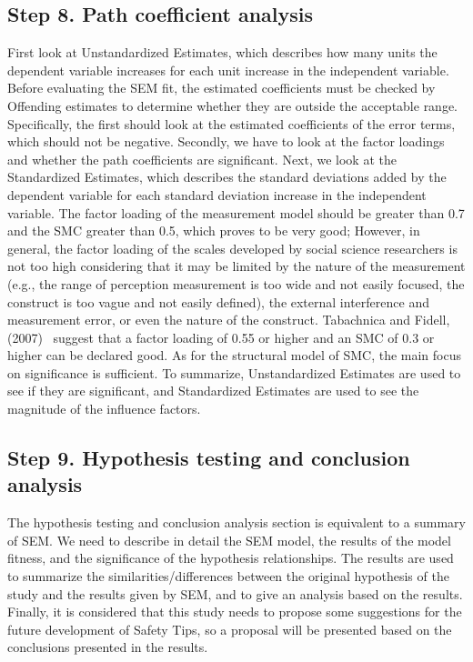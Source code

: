 \subsection{Step 8. Path coefficient analysis}
\label{step8}
First look at Unstandardized Estimates, which describes how many units the dependent variable increases for each unit increase in the independent variable. Before evaluating the SEM fit, the estimated coefficients must be checked by Offending estimates to determine whether they are outside the acceptable range. Specifically, the first should look at the estimated coefficients of the error terms, which should not be negative. Secondly, we have to look at the factor loadings and whether the path coefficients are significant. Next, we look at the Standardized Estimates, which describes the standard deviations added by the dependent variable for each standard deviation increase in the independent variable. The factor loading of the measurement model should be greater than 0.7 and the SMC greater than 0.5, which proves to be very good; However, in general, the factor loading of the scales developed by social science researchers is not too high considering that it may be limited by the nature of the measurement (e.g., the range of perception measurement is too wide and not easily focused, the construct is too vague and not easily defined), the external interference and measurement error, or even the nature of the construct. Tabachnica and Fidell, (2007)~\cite{ref26} suggest that a factor loading of 0.55 or higher and an SMC of 0.3 or higher can be declared good. As for the structural model of SMC, the main focus on significance is sufficient. To summarize, Unstandardized Estimates are used to see if they are significant, and Standardized Estimates are used to see the magnitude of the influence factors.


\subsection{Step 9. Hypothesis testing and conclusion analysis}
The hypothesis testing and conclusion analysis section is equivalent to a summary of SEM. We need to describe in detail the SEM model, the results of the model fitness, and the significance of the hypothesis relationships. The results are used to summarize the similarities/differences between the original hypothesis of the study and the results given by SEM, and to give an analysis based on the results. Finally, it is considered that this study needs to propose some suggestions for the future development of Safety Tips, so a proposal will be presented based on the conclusions presented in the results.



